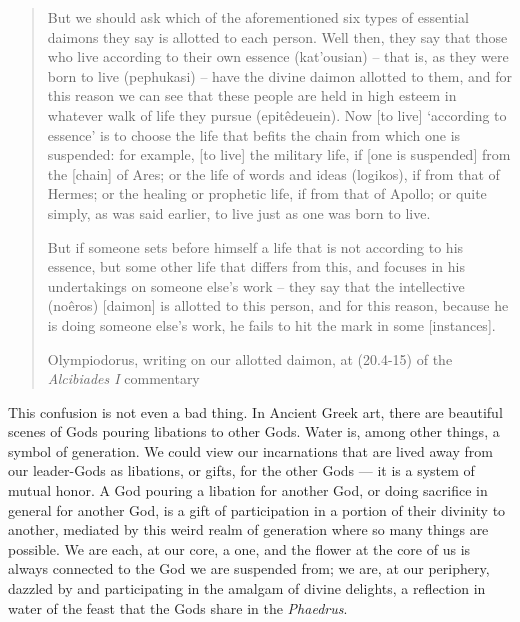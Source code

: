 \documentclass[
]{book}
\begin{document}
\begin{quote}
But we should ask which of the aforementioned six types of essential daimons they say is allotted to each person. Well then, they say that those who live according to their own essence (kat'ousian) -- that is, as they were born to live (pephukasi) -- have the divine daimon allotted to them, and for this reason we can see that these people are held in high esteem in whatever walk of life they pursue (epitêdeuein). Now {[}to live{]} `according to essence' is to choose the life that befits the chain from which one is suspended: for example, {[}to live{]} the military life, if {[}one is suspended{]} from the {[}chain{]} of Ares; or the life of words and ideas (logikos), if from that of Hermes; or the healing or prophetic life, if from that of Apollo; or quite simply, as was said earlier, to live just as one was born to live.

But if someone sets before himself a life that is not according to his essence, but some other life that differs from this, and focuses in his undertakings on someone else's work -- they say that the intellective (noêros) {[}daimon{]} is allotted to this person, and for this reason, because he is doing someone else's work, he fails to hit the mark in some {[}instances{]}.

Olympiodorus, writing on our allotted daimon, at (20.4-15) of the \emph{Alcibiades I} commentary
\end{quote}

This confusion is not even a bad thing. In Ancient Greek art, there are beautiful scenes of Gods pouring libations to other Gods. Water is, among other things, a symbol of generation. We could view our incarnations that are lived away from our leader-Gods as libations, or gifts, for the other Gods --- it is a system of mutual honor. A God pouring a libation for another God, or doing sacrifice in general for another God, is a gift of participation in a portion of their divinity to another, mediated by this weird realm of generation where so many things are possible. We are each, at our core, a one, and the flower at the core of us is always connected to the God we are suspended from; we are, at our periphery, dazzled by and participating in the amalgam of divine delights, a reflection in water of the feast that the Gods share in the \emph{Phaedrus}.
\end{document}
